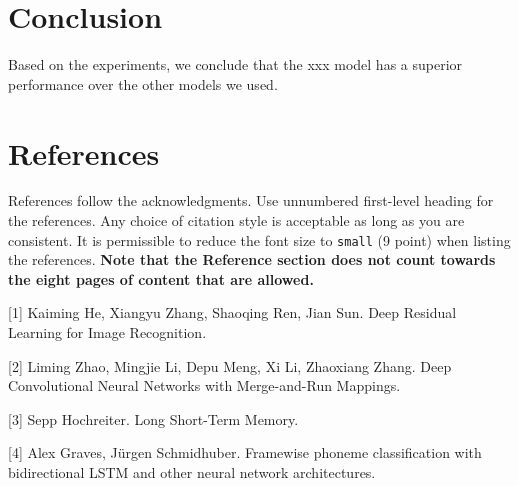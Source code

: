 \documentclass{article}
\begin{document}
\section{Conclusion}
Based on the experiments, we conclude that the xxx model has a superior performance over the other models we used.


\section*{References}

References follow the acknowledgments. Use unnumbered first-level heading for
the references. Any choice of citation style is acceptable as long as you are
consistent. It is permissible to reduce the font size to \verb+small+ (9 point)
when listing the references.
{\bf Note that the Reference section does not count towards the eight pages of content that are allowed.}
\medskip

\small

[1] Kaiming He, Xiangyu Zhang, Shaoqing Ren, Jian Sun. Deep Residual Learning for Image Recognition.

[2] Liming Zhao, Mingjie Li, Depu Meng, Xi Li, Zhaoxiang Zhang. Deep Convolutional Neural Networks with Merge-and-Run Mappings.

[3] Sepp Hochreiter. Long Short-Term Memory. 

[4] Alex Graves, Jürgen Schmidhuber. Framewise phoneme classification with bidirectional LSTM and other neural network architectures. 
\end{document}
